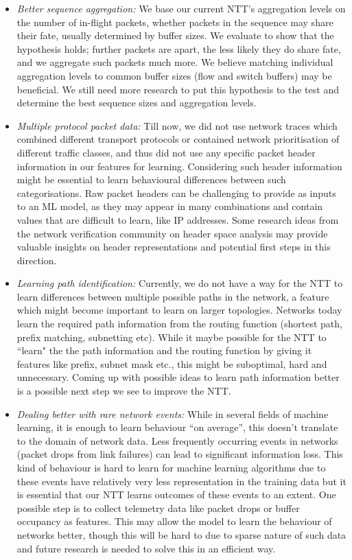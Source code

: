 \begin{itemize}
\item \emph{Better sequence aggregation:} We base our current NTT's aggregation levels on the number of in-flight packets, \ie whether packets in the sequence may share their fate, usually determined by buffer sizes. We evaluate to show that the hypothesis holds; further packets are apart, the less likely they do share fate, and we aggregate such packets much more. We believe matching individual aggregation levels to common buffer sizes (\eg flow and switch buffers) may be beneficial. We still need more research to put this hypothesis to the test and determine the best sequence sizes and aggregation levels.

\item \emph{Multiple protocol packet data:} Till now, we did not use network traces which combined different transport protocols or contained network prioritisation of different traffic classes, and thus did not use any specific packet header information in our features for learning. Considering such header information might be essential to learn behavioural differences between such categorisations. Raw packet headers can be challenging to provide as inputs to an ML model, as they may appear in many combinations and contain values that are difficult to learn, like IP addresses\cite{zhangMimicNetFastPerformance2021}. Some research ideas from the network verification community on header space analysis\cite{kazemianHeaderSpaceAnalysis} may provide valuable insights on header representations and potential first steps in this direction.

\item \emph{Learning path identification:} Currently, we do not have a way for the NTT to learn differences between multiple possible paths in the network, a feature which might become important to learn on larger topologies. Networks today learn the required path information from the routing function (\eg shortest path, prefix matching, subnetting etc). While it maybe possible for the NTT to ``learn" the the path information and the routing function by giving it features like prefix, subnet mask etc., this might be suboptimal, hard and unnecessary. Coming up with possible ideas to learn path information better is a possible next step we see to improve the NTT.

\item \emph{Dealing better with rare network events:} While in several fields of machine learning, it is enough to learn behaviour ``on average'', this doesn't translate to the domain of network data. Less frequently occurring events in networks (\eg packet drops from link failures) can lead to significant information loss. This kind of behaviour is hard to learn for machine learning algorithms due to these events have relatively very less representation in the training data but it is essential that our NTT learns outcomes of these events to an extent. One possible step is to collect telemetry data like packet drops or buffer occupancy as features. This may allow the model to learn the behaviour of networks better, though this will be hard to due to sparse nature of such data and future research is needed to solve this in an efficient way.
\end{itemize}
